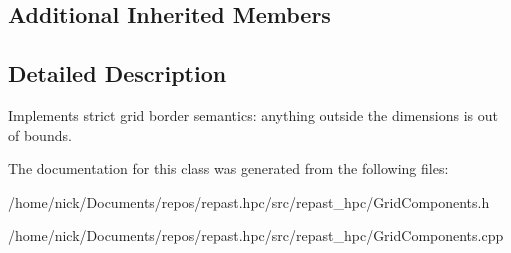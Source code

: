 \subsection*{Additional Inherited Members}


\subsection{Detailed Description}
Implements strict grid border semantics\-: anything outside the dimensions is out of bounds. 

The documentation for this class was generated from the following files\-:\begin{DoxyCompactItemize}
\item 
/home/nick/\-Documents/repos/repast.\-hpc/src/repast\-\_\-hpc/Grid\-Components.\-h\item 
/home/nick/\-Documents/repos/repast.\-hpc/src/repast\-\_\-hpc/Grid\-Components.\-cpp\end{DoxyCompactItemize}
